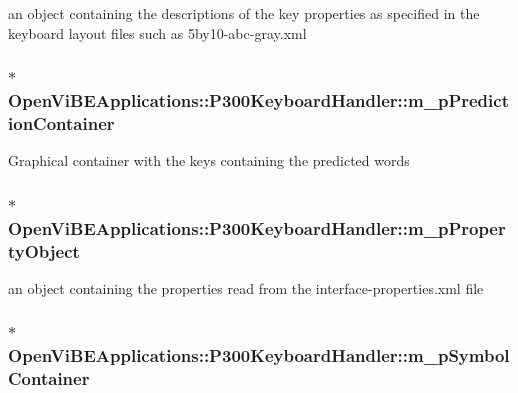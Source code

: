 \label{classOpenViBEApplications_1_1P300KeyboardHandler_a1fd87979441e2834eef9f3f363f49561}
an object containing the descriptions of the key properties as specified in the keyboard layout files such as 5by10-\/abc-\/gray.xml \hypertarget{classOpenViBEApplications_1_1P300KeyboardHandler_aaa8dbe9e453a27bb6741a57be97e9110}{
\subsubsection[{m\_\-pPredictionContainer}]{$\ast$ {\bf OpenViBEApplications::P300KeyboardHandler::m\_\-pPredictionContainer}}}
\label{classOpenViBEApplications_1_1P300KeyboardHandler_aaa8dbe9e453a27bb6741a57be97e9110}
Graphical container with the keys containing the predicted words \hypertarget{classOpenViBEApplications_1_1P300KeyboardHandler_a957c021c16780736cf2e175cdebc1f5a}{
\subsubsection[{m\_\-pPropertyObject}]{$\ast$ {\bf OpenViBEApplications::P300KeyboardHandler::m\_\-pPropertyObject}}}
\label{classOpenViBEApplications_1_1P300KeyboardHandler_a957c021c16780736cf2e175cdebc1f5a}
an object containing the properties read from the interface-\/properties.xml file \hypertarget{classOpenViBEApplications_1_1P300KeyboardHandler_a22390cd11cae7a74d0d22a52edb4f32c}{
\subsubsection[{m\_\-pSymbolContainer}]{$\ast$ {\bf OpenViBEApplications::P300KeyboardHandler::m\_\-pSymbolContainer}}}
